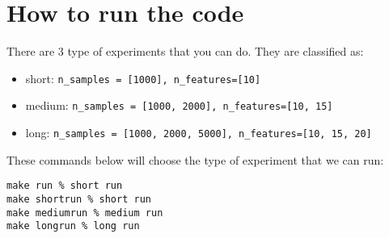 \documentclass[conference]{IEEEtran}
\begin{document}
\section{How to run the code}
There are 3 type of experiments that you can do. They are classified as:
\begin{itemize}
\item short: \lstinline{n_samples = [1000], n_features=[10]}
\item medium: \lstinline{n_samples = [1000, 2000], n_features=[10, 15]}
\item long: \lstinline{n_samples = [1000, 2000, 5000], n_features=[10, 15, 20]}
\end{itemize}

These commands below will choose the type of experiment that we can run:
\begin{lstlisting}
make run % short run
make shortrun % short run
make mediumrun % medium run
make longrun % long run
\end{lstlisting}





\end{document}
